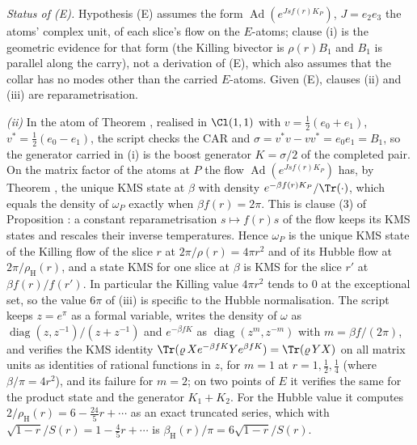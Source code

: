 \emph{Status of (E).} Hypothesis (E) assumes the form $\operatorname{Ad}(e^{Jsf(r)K_{P}})$, $J = e_{2}e_{3}$ the atoms' complex unit, of each slice's flow on the $E$-atoms; clause (i) is the geometric evidence for that form (the Killing bivector is $\rho(r)B_{1}$ and $B_{1}$ is parallel along the carry), not a derivation of (E), which also assumes that the collar has no modes other than the carried $E$-atoms. Given (E), clauses (ii) and (iii) are reparametrisation.

\emph{(ii)} In the atom of Theorem , realised in $\Cl(1,1)$ with $v = \tfrac12(e_{0} + e_{1})$, $v^{*} = \tfrac12(e_{0} - e_{1})$, the script checks the CAR and $\sigma = v^{*}v - vv^{*} = e_{0}e_{1} = B_{1}$, so the generator carried in (i) is the boost generator $K = \sigma/2$ of the completed pair. On the matrix factor of the atoms at $P$ the flow $\operatorname{Ad}(e^{Jsf(r)K_{P}})$ has, by Theorem , the unique KMS state at $\beta$ with density $e^{-\beta f(r)K_{P}}/\Tr(\cdot)$, which equals the density of $\omega_{P}$ exactly when $\beta f(r) = 2\pi$. This is clause (3) of Proposition : a constant reparametrisation $s \mapsto f(r)s$ of the flow keeps its KMS states and rescales their inverse temperatures. Hence $\omega_{P}$ is the unique KMS state of the Killing flow of the slice $r$ at $2\pi/\rho(r) = 4\pi r^{2}$ and of its Hubble flow at $2\pi/\rho_{\mathrm{H}}(r)$, and a state KMS for one slice at $\beta$ is KMS for the slice $r'$ at $\beta f(r)/f(r')$. In particular the Killing value $4\pi r^{2}$ tends to $0$ at the exceptional set, so the value $6\pi$ of (iii) is specific to the Hubble normalisation. The script keeps $z = e^{\pi}$ as a formal variable, writes the density of $\omega$ as $\operatorname{diag}(z, z^{-1})/(z + z^{-1})$ and $e^{-\beta f K}$ as $\operatorname{diag}(z^{m}, z^{-m})$ with $m = \beta f/(2\pi)$, and verifies the KMS identity $\Tr(\varrho\,X e^{-\beta fK}Ye^{\beta fK}) = \Tr(\varrho\,YX)$ on all matrix units as identities of rational functions in $z$, for $m = 1$ at $r = 1, \tfrac12, \tfrac14$ (where $\beta/\pi = 4r^{2}$), and its failure for $m = 2$; on two points of $E$ it verifies the same for the product state and the generator $K_{1} + K_{2}$. For the Hubble value it computes $2/\rho_{\mathrm{H}}(r) = 6 - \tfrac{24}{5}r + \cdots$ as an exact truncated series, which with $\sqrt{1-r}/S(r) = 1 - \tfrac45 r + \cdots$ is $\beta_{\mathrm{H}}(r)/\pi = 6\sqrt{1-r}/S(r)$.

